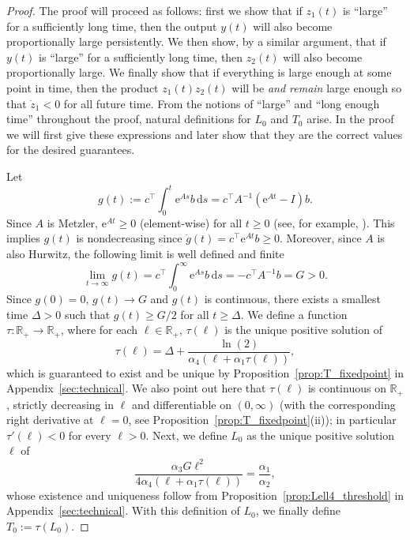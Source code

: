 \documentclass{article}
\newcommand{\e}{\mbox{e}}
\begin{document}
\begin{proof}
    The proof will proceed as follows: first we show that if $z_1(t)$ is ``large'' for a sufficiently long time, then the output $y(t)$ will also become proportionally large persistently. We then show, by a similar argument, that if $y(t)$ is ``large'' for a sufficiently long time, then $z_2(t)$ will also become proportionally large. We finally show that if everything is large enough at some point in time, then the product $z_1(t)z_2(t)$ will be \emph{and remain} large enough so that $\dot z_1<0$ for all future time. From the notions of ``large'' and ``long enough time'' throughout the proof, natural definitions for $L_0$ and $T_0$ arise. In the proof we will first give these expressions and later show that they are the correct values for the desired guarantees.

    Let 
    \begin{equation*}
        g(t):=c^\top \int_0^t\e^{As}b\,\mbox{d}s=c^\top A^{-1}(\e^{At}-I)b.
    \end{equation*}
    Since $A$ is Metzler, $\e^{At}\geq 0$ (element-wise) for all $t\ge0$ (see, for example, \cite{farina2000positive}). This implies $g(t)$ is nondecreasing since $\dot g(t)=c^\top \e^{At}b\geq0$. Moreover, since $A$ is also Hurwitz, the following limit is well defined and finite
    \begin{equation*}
        \lim_{t\to\infty}g(t)=c^\top\int_0^\infty \e^{As}b\,\mbox{d}s=-c^\top A^{-1}b=G > 0.
    \end{equation*}
    Since $g(0)=0$, $g(t)\to G$ and $g(t)$ is continuous, 
    there exists a smallest time $\Delta>0$ such that $g(t)\ge G/2$ for all $t\ge\Delta$.
    We define a function
    $\tau:\mathbb{R}_+\to\mathbb{R}_+$, where for each $\ell\in\mathbb{R}_+$, $\tau(\ell)$ is the unique positive solution of
    \begin{equation}\label{eq:T0_def}
        \tau(\ell) = \Delta+\frac{\ln(2)}{\alpha_4(\ell+\alpha_1\tau(\ell))},
    \end{equation}
    which is guaranteed to exist and be unique by Proposition~\ref{prop:T_fixedpoint} in Appendix~\ref{sec:technical}. We also point out here that $\tau(\ell)$ is continuous on $\mathbb{R}_+$, strictly decreasing in $\ell$ and differentiable on $(0,\infty)$ 
    (with the corresponding right derivative at $\ell=0$, see Proposition~\ref{prop:T_fixedpoint}(ii));
    in particular $\tau'(\ell) < 0$ for every $\ell>0$.
    Next, we define $L_0$ as the unique positive solution $\ell$ of
    \begin{equation}\label{eq:L0_def}
        \frac{\alpha_3 G\ell^2}{4\alpha_4(\ell+\alpha_1\tau(\ell))}=\frac{\alpha_1}{\alpha_2},
    \end{equation}
    whose existence and uniqueness follow from Proposition~\ref{prop:Lell4_threshold} in Appendix~\ref{sec:technical}. 
    With this definition of $L_0$, we finally define $T_0:=\tau(L_0)$. 


\end{proof}
\end{document}
